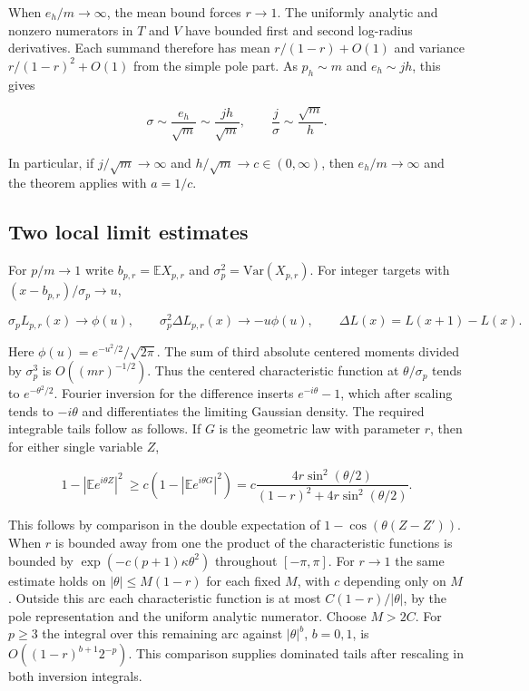\documentclass[11pt]{article}
\begin{document}
When \(e_h/m\to\infty\), the mean bound forces \(r\to1\). The uniformly analytic and nonzero numerators in \(T\) and \(V\) have bounded first and second log-radius derivatives. Each summand therefore has mean \(r/(1-r)+O(1)\) and variance \(r/(1-r)^2+O(1)\) from the simple pole part. As \(p_h\sim m\) and \(e_h\sim jh\), this gives

\begin{equation*}
\sigma\sim\frac{e_h}{\sqrt m}\sim\frac{jh}{\sqrt m},\qquad\frac{j}{\sigma}\sim\frac{\sqrt m}{h}.
\end{equation*}

In particular, if \(j/\sqrt m\to\infty\) and \(h/\sqrt m\to c\in(0,\infty)\), then \(e_h/m\to\infty\) and the theorem applies with \(a=1/c\).

\subsection{Two local limit estimates}
\label{sec:two-local-limit-estimates}

For \(p/m\to1\) write \(b_{p,r}=\mathbb E X_{p,r}\) and \(\sigma_p^2=\mathrm{Var}(X_{p,r})\). For integer targets with \((x-b_{p,r})/\sigma_p\to u\),

\begin{equation*}
\sigma_p L_{p,r}(x)\longrightarrow\phi(u),\qquad
\sigma_p^2\Delta L_{p,r}(x)\longrightarrow-u\phi(u),\qquad
\Delta L(x)=L(x+1)-L(x).
\end{equation*}

Here \(\phi(u)=e^{-u^2/2}/\sqrt{2\pi}\). The sum of third absolute centered moments divided by \(\sigma_p^3\) is \(O((mr)^{-1/2})\). Thus the centered characteristic function at \(\theta/\sigma_p\) tends to \(e^{-\theta^2/2}\). Fourier inversion for the difference inserts \(e^{-i\theta}-1\), which after scaling tends to \(-i\theta\) and differentiates the limiting Gaussian density. The required integrable tails follow as follows. If \(G\) is the geometric law with parameter \(r\), then for either single variable \(Z\),

\begin{equation*}
1-|\mathbb E e^{i\theta Z}|^2
\ \ge c(1-|\mathbb E e^{i\theta G}|^2)
=c\frac{4r\sin^2(\theta/2)}{(1-r)^2+4r\sin^2(\theta/2)} .
\end{equation*}

This follows by comparison in the double expectation of \(1-\cos(\theta(Z-Z'))\). When \(r\) is bounded away from one the product of the characteristic functions is bounded by \(\exp(-c(p+1)\kappa\theta^2)\) throughout \([-\pi,\pi]\). For \(r\to1\) the same estimate holds on \(|\theta|\le M(1-r)\) for each fixed \(M\), with \(c\) depending only on \(M\). Outside this arc each characteristic function is at most \(C(1-r)/|\theta|\), by the pole representation and the uniform analytic numerator. Choose \(M>2C\). For \(p\ge3\) the integral over this remaining arc against \(|\theta|^b\), \(b=0,1\), is \(O((1-r)^{b+1}2^{-p})\). This comparison supplies dominated tails after rescaling in both inversion integrals.
\end{document}
